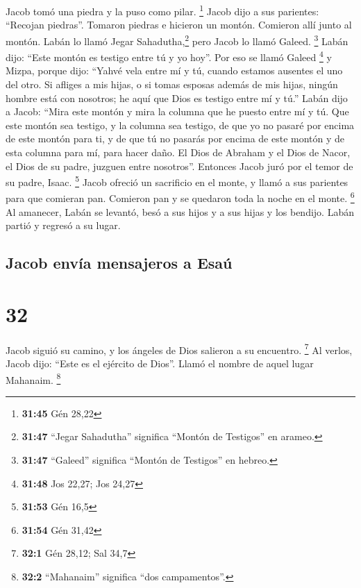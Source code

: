  Jacob tomó una piedra y la puso como pilar. \footnote{\textbf{31:45}
  Gén 28,22}  Jacob dijo a sus parientes: ``Recojan
piedras''. Tomaron piedras e hicieron un montón. Comieron allí junto al
montón.  Labán lo llamó Jegar Sahadutha,\footnote{\textbf{31:47}
  ``Jegar Sahadutha'' significa ``Montón de Testigos'' en arameo.} pero
Jacob lo llamó Galeed. \footnote{\textbf{31:47} ``Galeed'' significa
  ``Montón de Testigos'' en hebreo.}  Labán dijo: ``Este
montón es testigo entre tú y yo hoy''. Por eso se llamó Galeed
\footnote{\textbf{31:48} Jos 22,27; Jos 24,27}  y Mizpa,
porque dijo: ``Yahvé vela entre mí y tú, cuando estamos ausentes el uno
del otro.  Si afliges a mis hijas, o si tomas esposas
además de mis hijas, ningún hombre está con nosotros; he aquí que Dios
es testigo entre mí y tú.''  Labán dijo a Jacob: ``Mira
este montón y mira la columna que he puesto entre mí y tú.
 Que este montón sea testigo, y la columna sea testigo,
de que yo no pasaré por encima de este montón para ti, y de que tú no
pasarás por encima de este montón y de esta columna para mí, para hacer
daño.  El Dios de Abraham y el Dios de Nacor, el Dios de
su padre, juzguen entre nosotros''. Entonces Jacob juró por el temor de
su padre, Isaac. \footnote{\textbf{31:53} Gén 16,5} 
Jacob ofreció un sacrificio en el monte, y llamó a sus parientes para
que comieran pan. Comieron pan y se quedaron toda la noche en el monte.
\footnote{\textbf{31:54} Gén 31,42}  Al amanecer, Labán
se levantó, besó a sus hijos y a sus hijas y los bendijo. Labán partió y
regresó a su lugar.

\hypertarget{jacob-envuxeda-mensajeros-a-esauxfa}{%
\subsection{Jacob envía mensajeros a
Esaú}\label{jacob-envuxeda-mensajeros-a-esauxfa}}

\hypertarget{section-31}{%
\section{32}\label{section-31}}

 Jacob siguió su camino, y los ángeles de Dios salieron a
su encuentro. \footnote{\textbf{32:1} Gén 28,12; Sal 34,7}
 Al verlos, Jacob dijo: ``Este es el ejército de Dios''.
Llamó el nombre de aquel lugar Mahanaim. \footnote{\textbf{32:2}
  ``Mahanaim'' significa ``dos campamentos''.}

